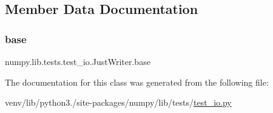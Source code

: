 \subsection{Member Data Documentation}
\mbox{\label{classnumpy_1_1lib_1_1tests_1_1test__io_1_1JustWriter_a3b3beccc8ac51b892a950e996c5b9f0a}} 
\subsubsection{\texorpdfstring{base}{base}}
{\footnotesize\ttfamily numpy.\+lib.\+tests.\+test\+\_\+io.\+Just\+Writer.\+base}



The documentation for this class was generated from the following file\+:\begin{DoxyCompactItemize}
\item 
venv/lib/python3./site-\/packages/numpy/lib/tests/\hyperlink{test__io_8py}{test\+\_\+io.\+py}\end{DoxyCompactItemize}
